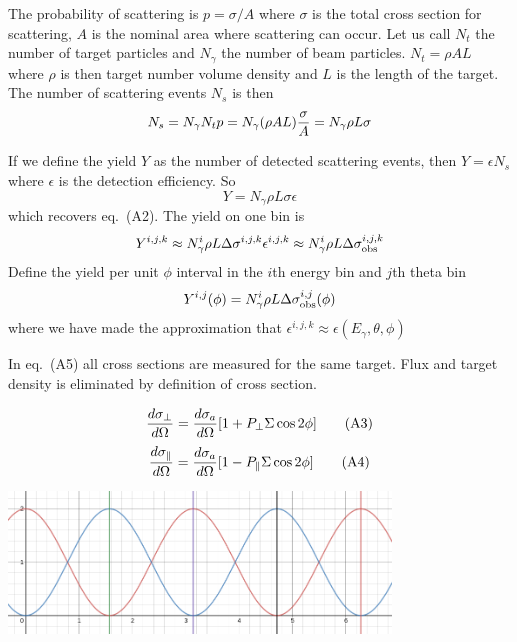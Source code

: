 \documentclass{article}
\begin{document}
The probability of scattering is $p = \sigma/A$ where $\sigma$ is the total cross section for scattering, $A$ is the nominal area where scattering can occur. Let us call $N_t$ the number of target particles and $N_\gamma$ the number of beam particles. $N_t = \rho AL$ where $\rho$ is then target number volume density and $L$ is the length of the target. The number of scattering events $N_s$ is then
\begin{equation}
N_s = N_\gamma N_t p = N_\gamma(\rho A L){\sigma\over A} = N_\gamma\rho L\sigma
\end{equation}

If we define the yield $Y$ as the number of detected scattering events, then $Y = \epsilon N_s$ where $\epsilon$ is the detection efficiency. So
\begin{equation}
Y = N_\gamma\rho L\sigma\epsilon
\end{equation}
which recovers eq.~(A2). The yield on one bin is
\begin{equation}
Y^{i,j,k} \approx N^i_\gamma\rho L\Delta\sigma^{i,j,k}\epsilon^{i,j,k} \\
\approx N^i_\gamma\rho L\Delta\sigma^{i,j,k}_{\rm obs}
\end{equation}
Define the yield per unit $\phi$ interval in the $i$th energy bin and $j$th theta bin
\begin{equation}
Y^{i,j}(\phi) = N^i_\gamma\rho L\Delta\sigma^{i,j}_{\rm obs}(\phi)
\end{equation}
where we have made the approximation that $\epsilon^{i,j,k} \approx \epsilon(E_\gamma,\theta,\phi)$

In eq.~(A5) all cross sections are measured for the same target. Flux and target density is eliminated by definition of cross section.

\begin{equation}
{d\sigma_\perp \over d\Omega} = {d\sigma_a \over d\Omega}[1+P_\perp\Sigma\cos 2\phi] \tag{A3} \\
\end{equation}
\begin{equation}
{d\sigma_\parallel \over d\Omega} = {d\sigma_a \over d\Omega}[1-P_\parallel\Sigma\cos 2\phi] \tag{A4} \\
\end{equation}

\includegraphics[width=4in]{assymetry.png}
\end{document}
